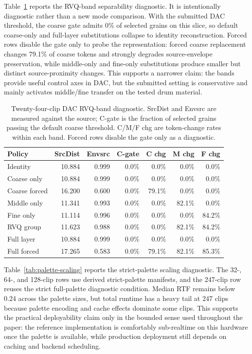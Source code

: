 \documentclass[twoside,a4paper]{article}
\begin{document}
Table~\ref{tab:rvq-band-diagnostic} reports the RVQ-band separability diagnostic. It is intentionally diagnostic rather than a new mode comparison. With the submitted DAC threshold, the coarse gate admits 0\% of selected grains on this slice, so default coarse-only and full-layer substitutions collapse to identity reconstruction. Forced rows disable the gate only to probe the representation: forced coarse replacement changes 79.1\% of coarse tokens and strongly degrades source-envelope preservation, while middle-only and fine-only substitutions produce smaller but distinct source-proximity changes. This supports a narrower claim: the bands provide useful control axes in DAC, but the submitted setting is conservative and mainly activates middle/fine transfer on the tested drum material.

\begin{table}[!t]
    \centering
    \scriptsize
    \setlength{\tabcolsep}{2pt}
    \caption{Twenty-four-clip DAC RVQ-band diagnostic. SrcDist and Envsrc are measured against the source; C-gate is the fraction of selected grains passing the default coarse threshold. C/M/F chg are token-change rates within each band. Forced rows disable the gate only as a diagnostic.}
    \label{tab:rvq-band-diagnostic}
    \begin{tabular}{lrrrrrr}
    \toprule
    Policy & SrcDist & Envsrc & C-gate & C chg & M chg & F chg \\
    \midrule
    Identity & 10.884 & 0.999 & 0.0\% & 0.0\% & 0.0\% & 0.0\% \\
    Coarse only & 10.884 & 0.999 & 0.0\% & 0.0\% & 0.0\% & 0.0\% \\
    Coarse forced & 16.200 & 0.600 & 0.0\% & 79.1\% & 0.0\% & 0.0\% \\
    Middle only & 11.341 & 0.993 & 0.0\% & 0.0\% & 82.1\% & 0.0\% \\
    Fine only & 11.114 & 0.996 & 0.0\% & 0.0\% & 0.0\% & 84.2\% \\
    RVQ group & 11.623 & 0.988 & 0.0\% & 0.0\% & 82.1\% & 84.2\% \\
    Full layer & 10.884 & 0.999 & 0.0\% & 0.0\% & 0.0\% & 0.0\% \\
    Full forced & 17.265 & 0.583 & 0.0\% & 79.1\% & 82.1\% & 85.3\% \\
    \bottomrule
    \end{tabular}
\end{table}

Table~\ref{tab:palette-scaling} reports the strict-palette scaling diagnostic. The 32-, 64-, and 128-clip rows use derived strict-palette manifests, and the 247-clip row reuses the strict full-palette diagnostic condition. Median RTF remains below 0.24 across the palette sizes, but total runtime has a heavy tail at 247 clips because palette encoding and cache effects dominate some clips. This supports the practical deployability claim only in the bounded sense used throughout the paper: the reference implementation is comfortably sub-realtime on this hardware once the palette is available, while production deployment still depends on caching and backend scheduling.
\end{document}
